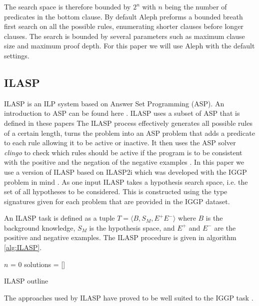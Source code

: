 The search space is therefore bounded by $2^n$ with $n$ being the number of predicates in the bottom clause. By default Aleph preforms a bounded breath first search on all the possible rules, enumerating shorter clauses before longer clauses. The search is bounded by several parameters such as maximum clause size and maximum proof depth. For this paper we will use Aleph with the default settings.

\subsection{ILASP}

ILASP is an ILP system based on Answer Set Programming (ASP). An introduction to ASP can be found here  \cite{Corapi/ASP}. ILASP uses a subset of ASP that is defined in these papers  \cite{ILASP-Manuel,MarkLaw/OG-ILASP,MarkLaw/Thesis} The ILASP process effectively generates all possible rules of a certain length, turns the problem into an ASP problem that adds a predicate to each rule allowing it to be active or inactive. It then uses the ASP solver \textit{clingo}  \cite{Clingo}  to check which rules should be active if the program is to be consistent with the positive and the negation of the negative examples  \cite{MarkLaw/OG-ILASP,MarkLaw/Thesis}. In this paper we use a version of ILASP based on ILASP2i  \cite{MarkLaw/ILASP2i} which was developed with the IGGP problem in mind \cite{Cropper/IGGP}. As one input ILASP takes a hypothesis search space, i.e. the set of all hypotheses to be considered. This is constructed using the type signatures given for each problem that are provided in the IGGP dataset.

An ILASP task is defined as a tuple $T = \langle B,S_M,E^+E^-\rangle$ where $B$ is the background knowledge, $S_M$ is the hypothesis space, and $E^+$ and $E^-$ are the positive and negative examples. The ILASP procedure is given in algorithm \ref{alg:ILASP}.
\begin{algorithm}[H]\label{alg:ILASP}
    \SetAlgoLined
    $n$ = 0\;
    solutions = []\;
    \caption{ILASP outline}
\end{algorithm}

The approaches used by ILASP have proved to be well suited to the IGGP task  \cite{Cropper/IGGP}.